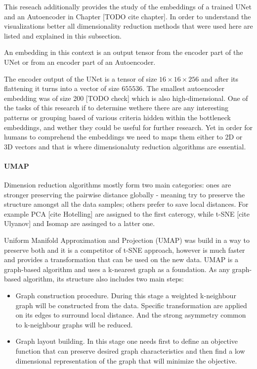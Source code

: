 This reseach additionally provides the study of the embeddings of a trained UNet and an Autoencoder in Chapter [TODO cite chapter]. In order to understand the visualizations better all dimensionality reduction methods that were used here are listed and explained in this subsection.

\begin{definition}[Embedding]
    An embedding in this context is an output tensor from the encoder part of the UNet or from an encoder part of an Autoencoder.
\end{definition}

The encoder output of the UNet is a tensor of size $16 \times 16 \times 256$ and after its flattening it turns into a vector of size $655536$. The smallest autoencoder embedding was of size 200 [TODO check] which is also high-dimensional. One of the tasks of this research if to determine wethere there are any interesting patterns or grouping based of various criteria hidden within the bottleneck embeddings, and wether they could be useful for further research. Yet in order for humans to comprehend the embeddings we need to maps them either to 2D or 3D vectors and that is where dimensionaluty reduction algorithms are essential.

\paragraph{UMAP}
Dimension reduction algorithms mostly form two main categories: ones are stronger preserving the pairwise
distance globally - meaning try to preserve the structure amongst all the data samples; others prefer to save local distances. For example PCA [cite Hotelling] are assigned to the first caterogy, while t-SNE [cite Ulyanov] and Isomap are assinged to a latter one.

Uniform Manifold Approximation and Projection (UMAP) was build in a way to preserve both and it is a competitor of t-SNE approach, however is much faster and provides a transformation that can be used on the new data. UMAP is a graph-based algorithm and uses a k-nearest graph as a foundation. As any graph-based algorithm, its structure also includes two main steps: 

\begin{itemize}
    \item Graph construction procedure. During this stage a weighted k-neighbour graph will be constructed from the data. Specific transformation are applied on its edges to surround local distance. And the strong asymmetry common to k-neighbour graphs will be reduced.
    \item Graph layout building. In this stage one needs first to define an objective function that can preserve desired graph characteristics and then find a low dimensional representation of the graph that will minimize the objective.
\end{itemize}


